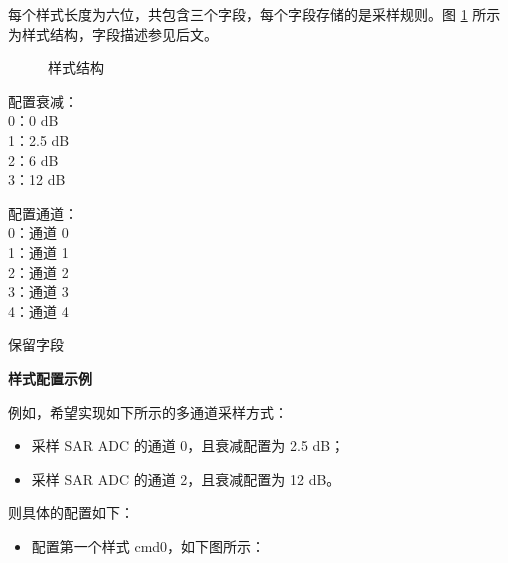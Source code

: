 \documentclass[main\_\_CN.tex]{subfiles}
\begin{document}
每个样式长度为六位，共包含三个字段，每个字段存储的是采样规则。图  \ref{fig:adc-pattern-table-entry} 所示为样式结构，字段描述参见后文。

\begin{figure}[H]
\centering
{}%
%
%
\end{figure}
\vspace{-2em}
\begin{figure}[H]
    \centering
    \caption{样式结构}
    \label{fig:adc-pattern-table-entry}
\end{figure}
\vspace{-2em}
\begin{regdesc}\begin{reglist}
\item [atten] 配置衰减：\\
0：0 dB\\
1：2.5 dB\\
2：6 dB\\
3：12 dB
\item [ch\_sel] 配置通道：\\
0：通道 0 \\
1：通道 1 \\
2：通道 2 \\
3：通道 3 \\
4：通道 4 \\
\item [(reserved)] 保留字段
\end{reglist}\end{regdesc}

\textbf{样式配置示例}

例如，希望实现如下所示的多通道采样方式：
\begin{itemize}
    \item 采样 SAR ADC 的通道 0，且衰减配置为 2.5 dB；
    \item 采样 SAR ADC 的通道 2，且衰减配置为 12 dB。
\end{itemize}

则具体的配置如下：

\begin{itemize}
    \item 配置第一个样式 cmd0，如下图所示：

\centering
{}%
%
%
\reglabel{}\regnewline%
\begin{regdesc}\end{regdesc}
\end{itemize}
\end{document}
